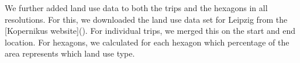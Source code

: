 

We further added land use data to both the trips and the hexagons in all resolutions.
For this, we downloaded the land use data set for Leipzig from the [Kopernikus website]().
For individual trips, we merged this on the start and end location. For hexagons, we calculated for each hexagon which percentage of the area represents which land use type.

